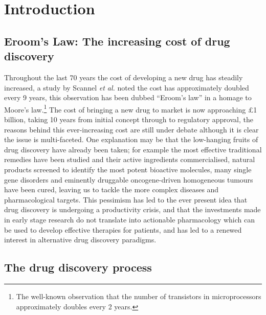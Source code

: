\documentclass[a4paper,11pt,twoside,openright]{scrbook}
\begin{document}
\chapter{Introduction} \label{chapter:intro}


\section{Eroom's Law: The increasing cost of drug discovery}
Throughout the last 70 years the cost of developing a new drug has steadily increased, a study by Scannel \textit{et al.} noted the cost has approximately doubled every 9 years, \cite{Scannell2012} this observation has been dubbed ``Eroom's law'' in a homage to Moore's law.\footnote{The well-known observation that the number of transistors in microprocessors approximately doubles every 2 years.}
The cost of bringing a new drug to market is now approaching £1 billion, taking 10 years from initial concept through to regulatory approval, the reasons behind this ever-increasing cost are still under debate although it is clear the issue is multi-faceted.
One explanation may be that the low-hanging fruits of drug discovery have already been taken; for example the most effective traditional remedies have been studied and their active ingredients commercialised, natural products screened to identify the most potent bioactive molecules, many single gene disorders and eminently druggable oncogene-driven homogeneous tumours have been cured, leaving us to tackle the more complex diseases and pharmacological targets.  
This pessimism has led to the ever present idea that drug discovery is undergoing a productivity crisis, \cite{Pammolli2011} and that the investments made in early stage research do not translate into actionable pharmacology which can be used to develop effective therapies for patients, and has led to a renewed interest in alternative drug discovery paradigms.


\section{The drug discovery process}
\end{document}
